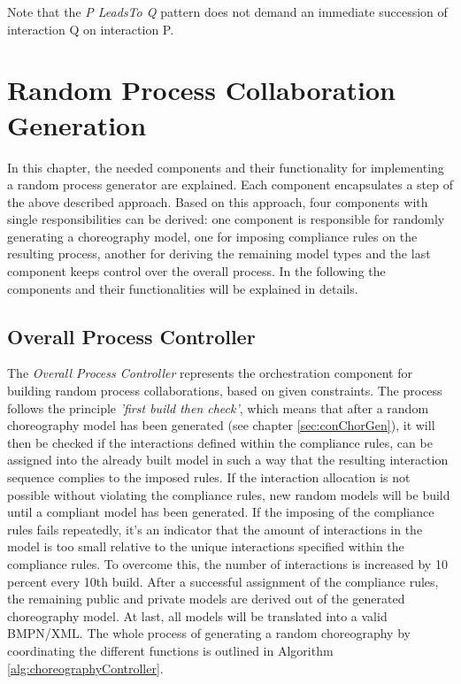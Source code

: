Note that the \textit{P LeadsTo Q} pattern does not demand an immediate succession of interaction Q on interaction P.


\section{Random Process Collaboration Generation}

In this chapter, the needed components and their functionality for implementing a random process generator are explained. Each component encapsulates a step of the above described approach. Based on this approach, four components with single responsibilities can be derived: one component is responsible for randomly generating a choreography model, one for imposing compliance rules on the resulting process, another for deriving the remaining model types and the last component keeps control over the overall process. In the following the components and their functionalities will be explained in details.

\subsection{Overall Process Controller} \label{sec:overallprocesscontroller}
The \textit{Overall Process Controller} represents the orchestration component for building random process collaborations, based on given constraints. The process follows the principle \textit{'first build then check'}, which means that after a random choreography model has been generated (see chapter \ref{sec:conChorGen}), it will then be checked if the interactions defined within the compliance rules, can be assigned into the already built model in such a way that the resulting interaction sequence complies to the imposed rules. If the interaction allocation is not possible without violating the compliance rules, new random models will be build until a compliant model has been generated. If the imposing of the compliance rules fails repeatedly, it's an indicator that the amount of interactions in the model is too small relative to the unique interactions specified within the compliance rules. To overcome this, the number of interactions is increased by 10 percent every 10th build. After a successful assignment of the compliance rules, the remaining public and private models are derived out of the generated choreography model. At last, all models will be translated into a valid BMPN/XML. The whole process of generating a random choreography by coordinating the different functions is outlined in Algorithm \ref{alg:choreographyController}. \\

